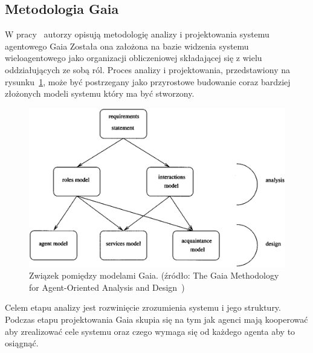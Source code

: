 \documentclass[11pt]{report}
\begin{document}
    \subsection{Metodologia Gaia}
    W pracy~\cite{Wooldridge2000a} autorzy opisują metodologię analizy i projektowania systemu agentowego Gaia
    Została ona założona na bazie widzenia systemu wieloagentowego jako organizacji obliczeniowej składającej się z wielu oddziałujących ze sobą ról.
    Proces analizy i projektowania, przedstawiony na rysunku~\ref{fig:gaia}, może być postrzegany jako przyrostowe budowanie coraz bardziej złożonych modeli systemu który ma być stworzony.
    \begin{figure}[!ht]
        \centering
        \includegraphics[width=\linewidth]{fig/gaia models.png}
        \caption{Związek pomiędzy modelami Gaia. (źródło: The Gaia Methodology for Agent-Oriented Analysis and Design~\cite{Wooldridge2000a})}
        \label{fig:gaia}
    \end{figure}
    Celem etapu analizy jest rozwinięcie zrozumienia systemu i jego struktury.
    Podczas etapu projektowania Gaia skupia się na tym jak agenci mają kooperować aby zrealizować cele systemu oraz czego wymaga się od każdego agenta aby to osiągnąć.
\end{document}
